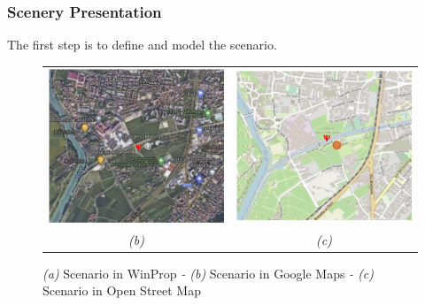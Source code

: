 \subsubsection{Scenery Presentation}
The first step is to define and model the scenario.

\begin{figure}[H]
\begin{center}\begin{tabular}{cc}
\includegraphics[scale=0.075]{./Figure/Planning.EM/Fig.Scenario.Rovereto.OSM.jpg}&
\includegraphics[scale=0.075]{./Figure/Planning.EM/Fig.Scenario.Rovereto.GM.jpg}\tabularnewline
\emph{(b)}&\emph{(c)}\tabularnewline
\end{tabular}\end{center}

\vspace{-10pt}
\caption{\footnotesize \emph{(a)} Scenario in WinProp \emph{- (b)} Scenario in Google Maps
\emph{- (c)} Scenario in Open Street Map}
\end{figure}
\vspace{-10pt}
